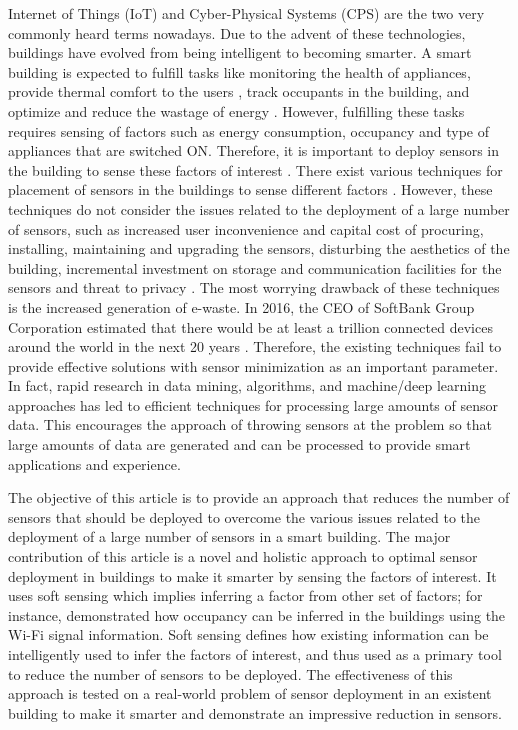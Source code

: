 \documentclass{article}
\begin{document}
Internet of Things (IoT) and Cyber-Physical Systems (CPS) are the two very commonly heard terms nowadays. Due to the advent of these technologies, buildings have evolved from being intelligent to becoming smarter. A smart building is expected to fulfill tasks like monitoring the health of appliances, provide thermal comfort to the users \citep{elsevier_hvac}, track occupants in the building, and optimize and reduce the wastage of energy \citep{karmakar}. However, fulfilling these tasks requires sensing of factors such as energy consumption, occupancy and type of appliances that are switched ON. Therefore, it is important to deploy sensors in the building to sense these factors of interest \citep{anshul_sensys_demo}. 
There exist various techniques for placement of sensors in the buildings to sense different factors \citep{bellala_electrons, meyn}. However, these techniques do not consider the issues related to the deployment of a large number of sensors, such as increased user inconvenience and capital cost of procuring, installing, maintaining and upgrading the sensors, disturbing the aesthetics of the building, incremental investment on storage and communication facilities for the sensors and threat to privacy \citep{hitchhiker_sensors,stankovic_iot}. The most worrying drawback of these techniques is the increased generation of e-waste. 
In 2016, the CEO of SoftBank Group Corporation estimated that there would be at least a trillion connected devices around the world in the next 20 years \citep{IntofTrash}. Therefore, the existing techniques fail to provide effective solutions with sensor minimization as an important parameter.
In fact, rapid research in data mining, algorithms, and machine/deep learning approaches has led to efficient techniques for processing large amounts of sensor data. This encourages the approach of throwing sensors at the problem so that large amounts of data are generated and can be processed to provide smart applications and experience. 

The objective of this article is to provide an approach that reduces the number of sensors that should be deployed to overcome the various issues related to the deployment of a large number of sensors in a smart building. The major contribution of this article is a novel and holistic approach to optimal sensor deployment in buildings to make it smarter by sensing the factors of interest. It uses soft sensing which implies inferring a factor from other set of factors; 
for instance, \cite{occupancy_wifi} demonstrated how occupancy can be inferred in the buildings using the Wi-Fi signal information. 
Soft sensing  
defines how existing information can be intelligently used to infer the factors of interest, and thus used as a primary tool to  reduce the number of sensors to be deployed. 
The effectiveness of this approach is tested on a real-world problem of sensor deployment in an existent building to make it smarter and demonstrate an impressive reduction in sensors.
\end{document}
